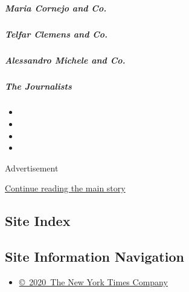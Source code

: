 \href{/interactive/2020/04/13/t-magazine/maria-cornejo-olivier-rousteing-telfar-clemens-alessandro-michele.html\#maria-cornejo-and-co}{}

\hypertarget{maria-cornejo-and-co}{%
\subparagraph{Maria Cornejo and Co.}\label{maria-cornejo-and-co}}

\href{/interactive/2020/04/13/t-magazine/maria-cornejo-olivier-rousteing-telfar-clemens-alessandro-michele.html\#telfar-clemens-and-co}{}

\hypertarget{telfar-clemens-and-co}{%
\subparagraph{Telfar Clemens and Co.}\label{telfar-clemens-and-co}}

\href{/interactive/2020/04/13/t-magazine/maria-cornejo-olivier-rousteing-telfar-clemens-alessandro-michele.html\#alessandro-michele-and-co}{}

\hypertarget{alessandro-michele-and-co}{%
\subparagraph{Alessandro Michele and
Co.}\label{alessandro-michele-and-co}}

\href{/interactive/2020/04/13/t-magazine/foreign-correspondents.html}{}

\hypertarget{the-journalists-1}{%
\subparagraph{The Journalists}\label{the-journalists-1}}

\begin{itemize}
\item
\item
\item
\item
\end{itemize}

Advertisement

\protect\hyperlink{after-bottom}{Continue reading the main story}

\hypertarget{site-index}{%
\subsection{Site Index}\label{site-index}}

\hypertarget{site-information-navigation}{%
\subsection{Site Information
Navigation}\label{site-information-navigation}}

\begin{itemize}
\tightlist
\item
  \href{https://help.nytimes3xbfgragh.onion/hc/en-us/articles/115014792127-Copyright-notice}{©~2020~The
  New York Times Company}
\end{itemize}


